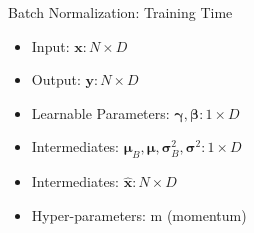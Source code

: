 \begin{frame}{Batch Normalization: Training Time}
%
\begin{multicols}{2}
\begin{itemize}
\item Input: $\pmb{x}: N\times D$
\item Output: $\pmb{y}: N\times D$
\item Learnable Parameters: $\pmb{\gamma}, \pmb{\beta}: 1\times D$
\item Intermediates: $\pmb{\mu}_B, \pmb{\mu}, \pmb{\sigma}_B^2, \pmb{\sigma}^2: 1\times D$
\item Intermediates:  $\hat{\pmb{x}}: N \times D$
\item Hyper-parameters: m (momentum)
\end{itemize}
\end{multicols}

\vspace{-30pt}


\end{frame}
